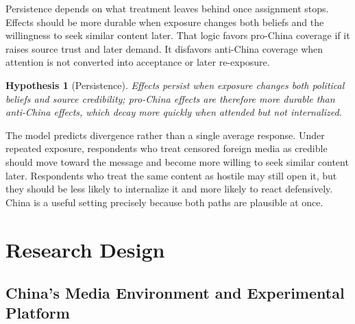 \documentclass[12pt,american]{article}
\newtheorem{hypothesis}{Hypothesis}
\begin{document}
	Persistence depends on what treatment leaves behind once assignment stops. Effects should be more durable when exposure changes both beliefs and the willingness to seek similar content later. That logic favors pro-China coverage if it raises source trust and later demand. It disfavors anti-China coverage when attention is not converted into acceptance or later re-exposure.
	\begin{singlespace}
		\begin{hypothesis}[Persistence]
			Effects persist when exposure changes both political beliefs and source credibility; pro-China effects are therefore more durable than anti-China effects, which decay more quickly when attended but not internalized.
		\end{hypothesis}
	\end{singlespace}
	
	The model predicts divergence rather than a single average response. Under repeated exposure, respondents who treat censored foreign media as credible should move toward the message and become more willing to seek similar content later. Respondents who treat the same content as hostile may still open it, but they should be less likely to internalize it and more likely to react defensively. China is a useful setting precisely because both paths are plausible at once.
	
	
	
	\section*{Research Design}
	
	\subsection*{China's Media Environment and Experimental Platform}
	
\end{document}
